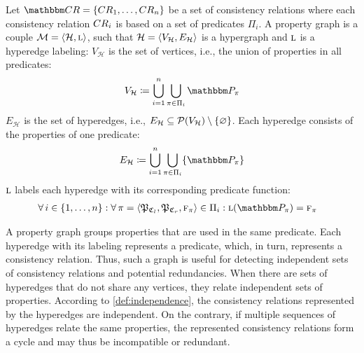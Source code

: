 \begin{definition} \label{def:propertygraph}
Let $\consistencyrelationset{CR} = \setted{\consistencyrelation{CR}{1}, \dots, \consistencyrelation{CR}{n}}$ be a set of consistency relations where each consistency relation $\consistencyrelation{CR}{i}$ is based on a set of predicates $\Pi_i$. 
A property graph is a couple $\mathcal{M}=\langle \mathcal{H}, \textsc{l} \rangle$, such that $\mathcal{H} = \langle V_{\mathcal{H}}, E_{\mathcal{H}} \rangle$ is a hypergraph and $\textsc{l}$
is a hyperedge labeling:
$V_{\mathcal{H}}$ is the set of vertices, i.e., the union of properties in all predicates:
\begin{align*}
    V_{\mathcal{H}} \equalsperdefinition \bigcup_{i = 1}^{n} \bigcup_{\pi \in \Pi_{i}} \propertycollection{\pi}
\end{align*}
%
$E_{\mathcal{H}}$ is the set of hyperedges, i.e., $E_{\mathcal{H}} \subseteq \mathcal{P}(V_{\mathcal{H}}) \setminus \{ \varnothing \}$. Each hyperedge consists of the properties of one predicate:
\begin{align*}
    E_{\mathcal{H}} \equalsperdefinition \bigcup_{i = 1}^{n} \bigcup_{\pi \in \Pi_{i}} \setted{\propertycollection{\pi}}
\end{align*}
$\textsc{l}$ labels each hyperedge with its corresponding predicate function:
\begin{align*}
    &\forall i \in \setted{1, \dots, n} : \forall \pi = \tupled{\propertysettuple{P}{\classtuple{C}{l}}, \propertysettuple{P}{\classtuple{C}{r}}, \function{f}_\pi} \in \Pi_{i} :
    \function{l}(\propertycollection{\pi}) = \function{f}_\pi
\end{align*}
\end{definition}

A property graph groups properties that are used in the same predicate.
Each hyperedge with its labeling represents a predicate, which, in turn, represents a consistency relation.
Thus, such a graph is useful for detecting independent sets of consistency relations and potential redundancies.
When there are sets of hyperedges that do not share any vertices, they relate independent sets of properties.
According to \autoref{def:independence}, the consistency relations represented by the hyperedges are independent.
On the contrary, if multiple sequences of hyperedges relate the same properties, the represented consistency relations form a cycle and may thus be incompatible or redundant.

